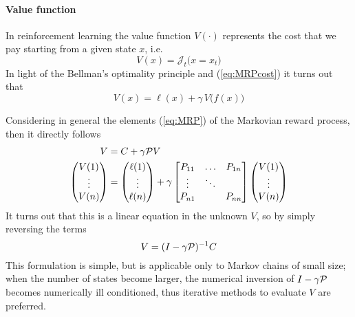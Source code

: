 	\paragraph{Value function} In reinforcement learning the value function $V(\cdot)$ represents the cost that we pay starting from a given state $x$, i.e. 
	\[ V(x) = \mathcal J_t\big(x=x_t\big) \]
	In light of the Bellman's optimality principle and (\ref{eq:MRPcost}) it turns out that
	\begin{equation}
		V(x) = \ell(x) + \gamma \, V\big(f(x)\big)
	\end{equation}
	
	Considering in general the elements (\ref{eq:MRP}) of the Markovian reward process, then it directly follows
	\begin{align*}
		V & = C + \gamma \mathcal P V \\ 
		\begin{pmatrix}
			V(1) \\ \vdots \\ V(n)
		\end{pmatrix} & = \begin{pmatrix}
			\ell(1) \\ \vdots \\ \ell(n)
		\end{pmatrix} + \gamma \begin{bmatrix}
			P_{11} & \dots & P_{1n} \\ 
			\vdots & \ddots \\
			P_{n1} & & P_{nn}
		\end{bmatrix} \begin{pmatrix}
			V(1) \\ \vdots \\ V(n)
		\end{pmatrix}
	\end{align*}
	It turns out that this is a linear equation in the unknown $V$, so by simply reversing the terms
	\begin{equation}
		V = (I-\gamma \mathcal P)^{-1} C
	\end{equation}
	This formulation is simple, but is applicable only to Markov chains of small size; when the number of states become larger, the numerical inversion of $I-\gamma \mathcal P$ becomes numerically ill conditioned, thus iterative methods to evaluate $V$ are preferred.
	
